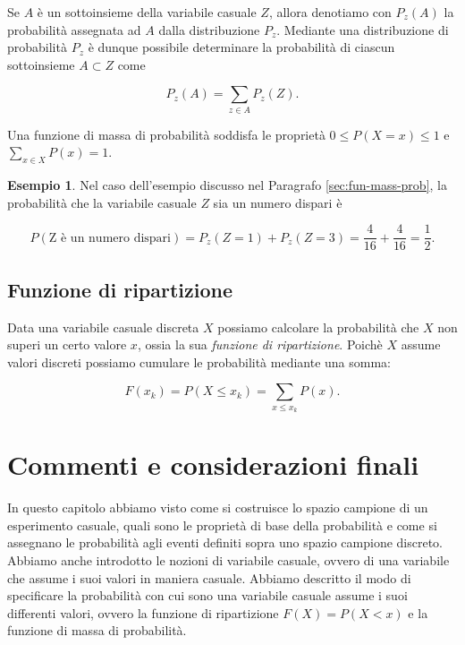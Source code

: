 \documentclass[
  11pt,
]{krantz}
\theoremstyle{definition}
\theoremstyle{definition}
\newtheorem{example}{Esempio}[chapter]
\theoremstyle{definition}
\theoremstyle{definition}
\theoremstyle{remark}
\begin{document}
Se \(A\) è un sottoinsieme della variabile casuale \(Z\), allora denotiamo con \(P_{z}(A)\) la probabilità assegnata ad \(A\) dalla distribuzione \(P_{z}\). Mediante una distribuzione di probabilità \(P_{z}\) è dunque possibile determinare la probabilità di ciascun sottoinsieme \(A \subset Z\) come

\begin{equation}
P_{z}(A) = \sum_{z \in A} P_{z}(Z).
\end{equation}

Una funzione di massa di probabilità soddisfa le proprietà \(0 \leq P(X=x) \leq 1\) e \(\sum_{x \in X} P(x) = 1\).

\begin{example}
Nel caso dell'esempio discusso nel Paragrafo \ref{sec:fun-mass-prob}, la probabilità che la variabile casuale \(Z\) sia un numero dispari è

\[
P(\text{Z è un numero dispari}) = P_{z}(Z = 1) + P_{z}(Z = 3) = \frac{4}{16} + \frac{4}{16} = \frac{1}{2}.
\]
\end{example}

\hypertarget{funzione-di-ripartizione}{%
\subsection{Funzione di ripartizione}\label{funzione-di-ripartizione}}

Data una variabile casuale discreta \(X\) possiamo calcolare la probabilità che \(X\) non superi un certo valore \(x\), ossia la sua \emph{funzione di ripartizione}. Poichè \(X\) assume valori discreti possiamo cumulare le probabilità mediante una somma:

\begin{equation}
F(x_k) = P(X \leq x_k) = \sum_{x \leq x_k} P(x).
\end{equation}

\hypertarget{commenti-e-considerazioni-finali}{%
\section*{Commenti e considerazioni finali}\label{commenti-e-considerazioni-finali}}


In questo capitolo abbiamo visto come si costruisce lo spazio campione di un esperimento casuale, quali sono le proprietà di base della probabilità e come si assegnano le probabilità agli eventi definiti sopra uno spazio campione discreto. Abbiamo anche introdotto le nozioni di variabile casuale, ovvero di una variabile che assume i suoi valori in maniera casuale. Abbiamo descritto il modo di specificare la probabilità con cui sono una variabile casuale assume i suoi differenti valori, ovvero la funzione di ripartizione \(F(X) = P(X < x)\) e la funzione di massa di probabilità.
\end{document}
